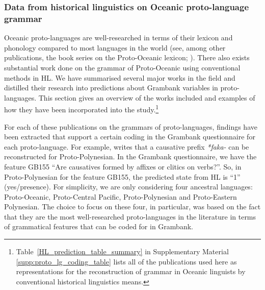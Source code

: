 \documentclass[12pt,letterpaper]{article}
\begin{document}
\FloatBarrier
\subsubsection{Data from historical linguistics on Oceanic proto-language grammar}
\label{sec:POC_lit_review}

Oceanic proto-languages are well-researched in terms of their lexicon and phonology compared to most languages in the world (see, among other publications, the book series on the Proto-Oceanic lexicon; \citealt{protooceanicvol1, protooceanicvol2, protooceanicvol3, protooceanicvol4, protooceanicvol5}). There also exists substantial work done on the grammar of Proto-Oceanic using conventional methods in HL. We have summarised several major works in the field and distilled their research into predictions about Grambank variables in proto-languages. This section gives an overview of the works included and examples of how they have been incorporated into the study.\footnote{Table~\ref{HL_prediction_table_summary} in Supplementary Material \ref{supp:proto_lg_coding_table} lists all of the publications used here as representations for the reconstruction of grammar in Oceanic linguists by conventional historical linguistics means.}

For each of these publications on the grammars of proto-languages, findings have been extracted that support a certain coding in the Grambank questionnaire for each proto-language. For example, \citet[4]{marck2000_encyclo} writes that a causative prefix \textit{*faka-} can be reconstructed for Proto-Polynesian. In the Grambank questionnaire, we have the feature GB155 ``Are causatives formed by affixes or clitics on verbs?''. So, in Proto-Polynesian for the feature GB155, the predicted state from HL is ``1'' (yes/presence). For simplicity, we are only considering four ancestral languages: Proto-Oceanic, Proto-Central Pacific, Proto-Polynesian and Proto-Eastern Polynesian. The choice to focus on these four, in particular, was based on the fact that they are the most well-researched proto-languages in the literature in terms of grammatical features that can be coded for in Grambank. 

\end{document}
